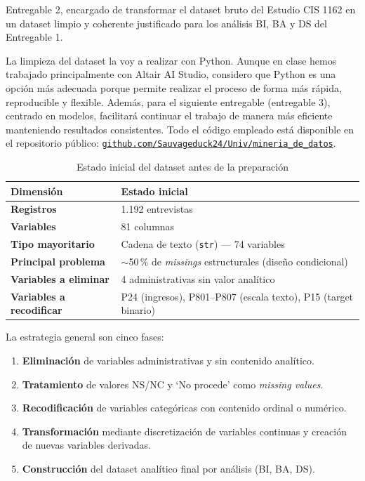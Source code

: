 \documentclass[12pt,a4paper]{article}
\begin{document}
Entregable 2, encargado de transformar el dataset bruto del Estudio CIS 1162 en un dataset limpio y coherente justificado para los análisis BI, BA y DS del Entregable 1.

La limpieza del dataset la voy a realizar con Python. Aunque en clase hemos trabajado principalmente con Altair AI Studio, considero que Python es una opción más adecuada porque permite realizar el proceso de forma más rápida, reproducible y flexible. Además, para el siguiente entregable (entregable 3), centrado en modelos, facilitará continuar el trabajo de manera más eficiente manteniendo resultados consistentes. Todo el código empleado está disponible en el repositorio público: \href{https://github.com/Sauvageduck24/Univ/tree/main/mineria_de_datos}{\texttt{github.com/Sauvageduck24/Univ/mineria\_de\_datos}}.

\vspace{0.5em}
\begin{table}[H]
\centering
\renewcommand{\arraystretch}{1.3}
\begin{tabularx}{\linewidth}{>{\bfseries}p{4.5cm} X}
\toprule
\rowcolor{tableheader}\color{white}Dimensión & \color{white}Estado inicial \\
\midrule
Registros        & 1.192 entrevistas \\
\rowcolor{tablerow}
Variables        & 81 columnas \\
Tipo mayoritario & Cadena de texto (\texttt{str}) — 74 variables \\
\rowcolor{tablerow}
Principal problema & $\sim$50\,\% de \textit{missings} estructurales (diseño condicional) \\
Variables a eliminar & 4 administrativas sin valor analítico \\
\rowcolor{tablerow}
Variables a recodificar & P24 (ingresos), P801--P807 (escala texto), P15 (target binario) \\
\bottomrule
\end{tabularx}
\caption{Estado inicial del dataset antes de la preparación}
\end{table}

La estrategia general son cinco fases:

\begin{enumerate}[leftmargin=1.8em]
  \item \textbf{Eliminación} de variables administrativas y sin contenido analítico.
  \item \textbf{Tratamiento} de valores NS/NC y `No procede' como \textit{missing values}.
  \item \textbf{Recodificación} de variables categóricas con contenido ordinal o numérico.
  \item \textbf{Transformación} mediante discretización de variables continuas y creación de nuevas variables derivadas.
  \item \textbf{Construcción} del dataset analítico final por análisis (BI, BA, DS).
\end{enumerate}
\end{document}
